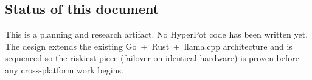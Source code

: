 \subsection{Status of this document}
This is a planning and research artifact. No HyperPot code has been written yet.
The design extends the existing Go~+~Rust~+~llama.cpp architecture and is
sequenced so the riskiest piece (failover on identical hardware) is proven before
any cross-platform work begins.
